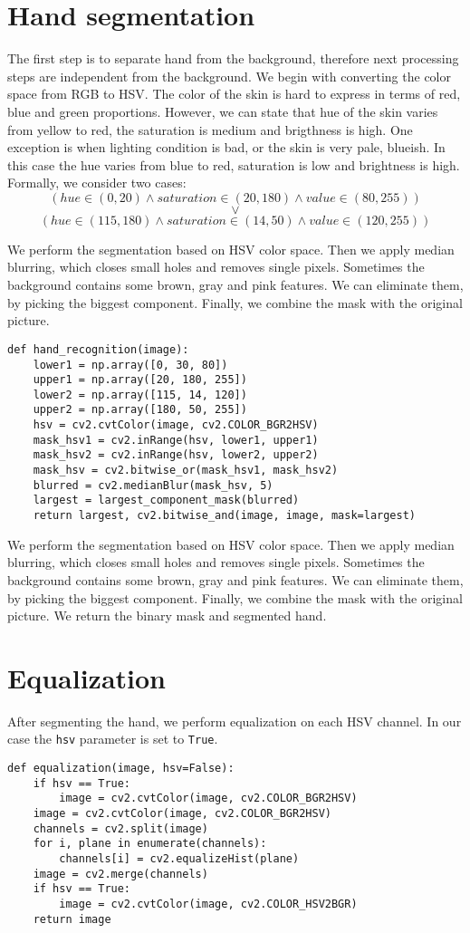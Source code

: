 \documentclass{article} %
\newcounter{terms}
\begin{document}
\section{Hand segmentation}
The first step is to separate hand from the background, therefore next processing steps are independent from the background.
We begin with converting the color space from RGB to HSV. The color of the skin is hard to express in terms of red, blue and green proportions. However, we can state that hue of the skin varies from yellow to red, the saturation is medium and brigthness is high. One exception is when lighting condition is bad, or the skin is very pale, blueish. In this case the hue varies from blue to red, saturation is low and brightness is high.
Formally, we consider two cases:
$$(hue \in (0,20) \wedge saturation \in (20,180) \wedge value \in (80,255))$$
$$\vee$$
$$(hue \in (115,180) \wedge saturation \in (14,50) \wedge value \in (120,255))$$

We perform the segmentation based on HSV color space. Then we apply median blurring, which closes small holes and removes single pixels.
Sometimes the background contains some brown, gray and pink features. We can eliminate them, by picking the biggest component.
Finally, we combine the mask with the original picture.

\begin{lstlisting}
def hand_recognition(image):
    lower1 = np.array([0, 30, 80])
    upper1 = np.array([20, 180, 255])
    lower2 = np.array([115, 14, 120])
    upper2 = np.array([180, 50, 255])
    hsv = cv2.cvtColor(image, cv2.COLOR_BGR2HSV)
    mask_hsv1 = cv2.inRange(hsv, lower1, upper1)
    mask_hsv2 = cv2.inRange(hsv, lower2, upper2)
    mask_hsv = cv2.bitwise_or(mask_hsv1, mask_hsv2)
    blurred = cv2.medianBlur(mask_hsv, 5)
    largest = largest_component_mask(blurred)
    return largest, cv2.bitwise_and(image, image, mask=largest)
\end{lstlisting}
We perform the segmentation based on HSV color space. Then we apply median blurring, which closes small holes and removes single pixels.
Sometimes the background contains some brown, gray and pink features. We can eliminate them, by picking the biggest component.
Finally, we combine the mask with the original picture.
We return the binary mask and segmented hand.


\section{Equalization}
After segmenting the hand, we perform equalization on each HSV channel. In our case the \texttt{hsv} parameter is set to \texttt{True}.
\begin{lstlisting}
def equalization(image, hsv=False):
    if hsv == True:
        image = cv2.cvtColor(image, cv2.COLOR_BGR2HSV)
    image = cv2.cvtColor(image, cv2.COLOR_BGR2HSV)
    channels = cv2.split(image)
    for i, plane in enumerate(channels):
        channels[i] = cv2.equalizeHist(plane)
    image = cv2.merge(channels)
    if hsv == True:
        image = cv2.cvtColor(image, cv2.COLOR_HSV2BGR)
    return image
\end{lstlisting}
\end{document}
